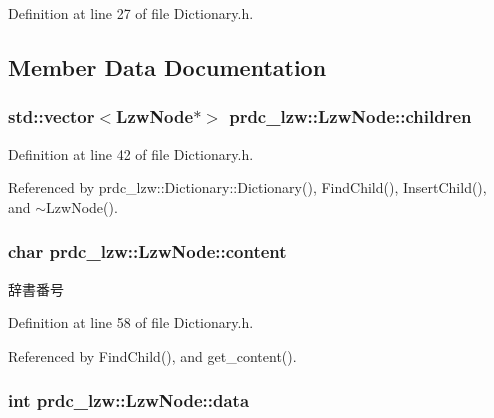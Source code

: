 Definition at line 27 of file Dictionary.\-h.



\subsection{Member Data Documentation}
\hypertarget{classprdc__lzw_1_1LzwNode_abc56c04f0b0f97baf8e2b3f08d736463}{
\subsubsection[{children}]{\setlength{\rightskip}{0pt plus 5cm}std\-::vector$<${\bf Lzw\-Node}$\ast$$>$ prdc\-\_\-lzw\-::\-Lzw\-Node\-::children}}\label{classprdc__lzw_1_1LzwNode_abc56c04f0b0f97baf8e2b3f08d736463}


Definition at line 42 of file Dictionary.\-h.



Referenced by prdc\-\_\-lzw\-::\-Dictionary\-::\-Dictionary(), Find\-Child(), Insert\-Child(), and $\sim$\-Lzw\-Node().

\hypertarget{classprdc__lzw_1_1LzwNode_acb2b7cb34053125cfdf7595aba9bc172}{
\subsubsection[{content}]{\setlength{\rightskip}{0pt plus 5cm}char prdc\-\_\-lzw\-::\-Lzw\-Node\-::content\hspace{0.3cm}{\ttfamily [private]}}}\label{classprdc__lzw_1_1LzwNode_acb2b7cb34053125cfdf7595aba9bc172}


辞書番号 



Definition at line 58 of file Dictionary.\-h.



Referenced by Find\-Child(), and get\-\_\-content().

\hypertarget{classprdc__lzw_1_1LzwNode_ac85178681ea1181b22c3ac43af32515a}{
\subsubsection[{data}]{\setlength{\rightskip}{0pt plus 5cm}int prdc\-\_\-lzw\-::\-Lzw\-Node\-::data\hspace{0.3cm}{\ttfamily [private]}}}\label{classprdc__lzw_1_1LzwNode_ac85178681ea1181b22c3ac43af32515a}


